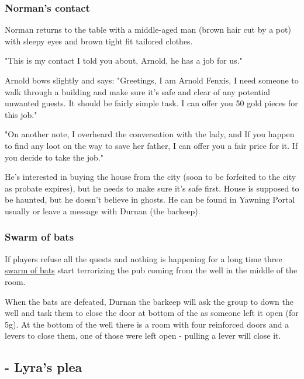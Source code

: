 \documentclass[10pt,onecolumn,twoside,openany,bg=full,layout=true]{dndbook}
\begin{document}
\subsubsection{Norman's contact}
\begin{DndReadAloud}
  Norman returns to the table with a middle-aged man (brown hair cut by a pot) with sleepy eyes and brown tight fit tailored clothes.

  "This is my contact I told you about, Arnold, he has a job for us."

  Arnold bows slightly and says:
  "Greetings, I am Arnold Fenxis, I need someone to walk through a building and make sure it's safe and clear of any potential unwanted guests.
  It should be fairly simple task.
  I can offer you 50 gold pieces for this job."

  "On another note, I overheard the conversation with the lady, and If you happen to find any loot on the way to save her father, I can offer you a fair price for it.
  If you decide to take the job."
\end{DndReadAloud}
He's interested in buying the house from the city (soon to be forfeited to the city as probate expires), but he needs to make sure it's safe first.
House is supposed to be haunted, but he doesn't believe in ghosts.
He can be found in Yawning Portal usually or leave a message with Durnan (the barkeep).

\subsubsection{Swarm of bats}
If players refuse all the quests and nothing is happening for a long time three
\href{https://www.dndbeyond.com/monsters/17028-swarm-of-bats}{swarm of bats} start terrorizing the pub coming from the well in the middle of the room.

When the bats are defeated, Durnan the barkeep will ask the group to down the well and task them to close the door at bottom of the as someone left it open (for 5g).
At the bottom of the well there is a room with four reinforced doors and a levers to close them, one of those were left open - pulling a lever will close it.
\vfill
\newpage

\subsection{ - Lyra's plea}\label{subsec:\arabic{subact_num}-lyras-plea}
\addtocounter{subact_num}{1}
\end{document}
